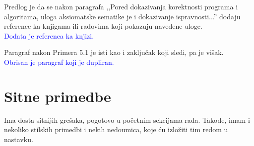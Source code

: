\documentclass[a4paper]{report}
\newcommand{\odgovor}[1]{\textcolor{blue}{#1}}
\begin{document}
{Predlog je da se nakon paragrafa ‚‚Pored dokazivanja korektnosti programa i algoritama, uloga aksiomatske sematike je i dokazivanje ispravnosti...'' dodaju reference ka knjigama ili radovima koji pokazuju navedene uloge.}  \\
\odgovor {Dodata je referenca ka knjizi.}
	
{Paragraf nakon Primera 5.1 je isti kao i zaključak koji sledi, pa je višak.} \\
\odgovor {Obrisan je paragraf koji je dupliran. }

\section{Sitne primedbe}

{Ima dosta sitnijih grešaka, pogotovo u početnim sekcijama rada. Takođe, imam i nekoliko stilskih primedbi i nekih nedoumica, koje ću izložiti tim redom u nastavku.}
\end{document}
